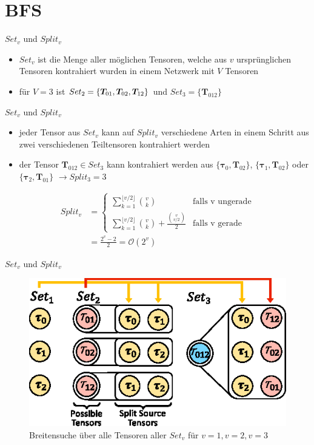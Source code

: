 \documentclass{beamer}
\begin{document}
\section{BFS}

\begin{frame}{$Set_v$ und $Split_v$}
	\begin{itemize}
		\item $Set_v$ ist die Menge aller möglichen Tensoren, welche aus $v$ ursprünglichen Tensoren kontrahiert wurden in einem Netzwerk mit $V$ Tensoren
		\item für $V = 3$ ist $Set_2 = \{\bm{T}_{01}, \bm{T_}{02}, \bm{T}_{12} \}$ und $Set_3 = \{\bm{T}_{012} \}$
	\end{itemize}
\end{frame}

\begin{frame}{$Set_v$ und $Split_v$}
	\begin{itemize}
		\item jeder Tensor aus $Set_v$ kann auf $Split_v$ verschiedene Arten in einem Schritt aus zwei verschiedenen Teiltensoren kontrahiert werden
		\item der Tensor $\bm{T}_{012} \in Set_3$ kann kontrahiert werden aus $\{\bm{\tau}_0, \bm{T}_{02} \}$, $\{\bm{\tau}_{1}, \bm{T}_{02} \}$ oder $\{\bm{\tau}_{2}, \bm{T}_{01} \}$ $\rightarrow Split_3 = 3$
	\end{itemize}
	\begin{align*}
		Split_v & = \begin{cases}
			            \sum^{\lfloor v/2 \rfloor}_{k=1} \binom{v}{k}                            & \text{falls v ungerade} \\
			            \sum^{\lfloor v/2 \rfloor}_{k=1} \binom{v}{k} + \frac{\binom{v}{v/2}}{2} & \text{falls v gerade}
		            \end{cases} \\
		        & = \frac{2^v - 2}{2} = \mathcal{O}(2^v)
	\end{align*}
\end{frame}

\begin{frame}{$Set_v$ und $Split_v$}
	\begin{figure}
		\includegraphics{figure_04}
		\caption*{Breitensuche über alle Tensoren aller $Set_v$ für $v=1, v=2, v=3$}
	\end{figure}
\end{frame}
\end{document}
